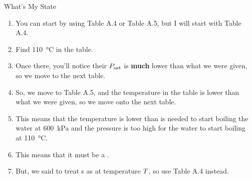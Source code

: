 \begin{example}[Problem 4.23]{What's My State}
\begin{enumerate}[noitemsep]
    \begin{enumerate}[noitemsep]
    \item You can start by using Table A.4 or Table A.5, but I will start with Table A.4.
    \item Find \SI{110}{\degreeCelsius} in the table.
    \item Once there, you'll notice their $P_{\mathrm{sat}}$ is \textbf{much} lower than what we were given, so we move to the next table.
    \item So, we move to Table A.5, and the temperature in the table is lower than what we were given, so we move onto the next table.
    \item This means that the temperature is lower than is needed to start boiling the water at \SI{600}{\kilo\pascal} and the pressure is too high for the water to start boiling at \SI{110}{\degreeCelsius}.
    \item This means that it must be a .
    \item But, we said to treat s as  at temperature $T$, so use Table A.4 instead.
    \end{enumerate}
  \end{enumerate}
\end{example}

